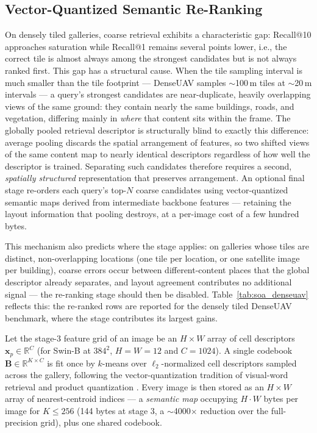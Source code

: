 \documentclass[conference]{IEEEtran}
\begin{document}
\subsection{Vector-Quantized Semantic Re-Ranking}
\label{sec:vq_rerank}
On densely tiled galleries, coarse retrieval exhibits a characteristic gap:
Recall@10 approaches saturation while Recall@1 remains several points lower,
i.e., the correct tile is almost always among the strongest candidates but is
not always ranked first. This gap has a structural cause. When the tile
sampling interval is much smaller than the tile footprint — DenseUAV samples
$\sim$100\,m tiles at $\sim$20\,m intervals — a query's strongest candidates
are near-duplicate, heavily overlapping views of the same ground: they
contain nearly the same buildings, roads, and vegetation, differing mainly
in \emph{where} that content sits within the frame. The globally pooled
retrieval descriptor is structurally blind to exactly this difference:
average pooling discards the spatial arrangement of features, so two
shifted views of the same content map to nearly identical descriptors
regardless of how well the descriptor is trained. Separating such
candidates therefore requires a second, \emph{spatially structured}
representation that preserves arrangement. An optional final stage
re-orders each query's top-$N$ coarse candidates using vector-quantized
semantic maps derived from intermediate backbone features — retaining the
layout information that pooling destroys, at a per-image cost of a few
hundred bytes.

This mechanism also predicts where the stage applies: on galleries whose
tiles are distinct, non-overlapping locations (one tile per location, or
one satellite image per building), coarse errors occur between
different-content places that the global descriptor already separates, and
layout agreement contributes no additional signal — the re-ranking stage
should then be disabled. Table~\ref{tab:soa_denseuav} reflects this:
the re-ranked rows are reported for the densely tiled DenseUAV benchmark,
where the stage contributes its largest gains.

Let the stage-3 feature grid of an image be an $H \times W$ array of cell
descriptors $\mathbf{x}_{p} \in \mathbb{R}^{C}$ (for Swin-B at $384^2$,
$H{=}W{=}12$ and $C{=}1024$). A single codebook
$\mathbf{B} \in \mathbb{R}^{K \times C}$ is fit once by $k$-means over
$\ell_2$-normalized cell descriptors sampled across the gallery, following
the vector-quantization tradition of visual-word retrieval
\cite{sivic2003video} and product quantization \cite{jegou2011product}.
Every image is then stored as an $H \times W$ array of nearest-centroid
indices — a \emph{semantic map} occupying $H\!\cdot\!W$ bytes per image for
$K \le 256$ (144 bytes at stage 3, a $\sim$4000$\times$ reduction over the
full-precision grid), plus one shared codebook.
\end{document}
